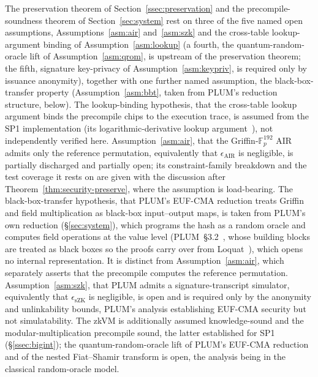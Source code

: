 The preservation theorem of Section~\ref{ssec:preservation} and the precompile-soundness theorem of Section~\ref{sec:system} rest on three of the five named open assumptions, Assumptions~\ref{asm:air} and~\ref{asm:szk} and the cross-table lookup-argument binding of Assumption~\ref{asm:lookup} (a fourth, the quantum-random-oracle lift of Assumption~\ref{asm:qrom}, is upstream of the preservation theorem; the fifth, signature key-privacy of Assumption~\ref{asm:keypriv}, is required only by issuance anonymity), together with one further named assumption, the black-box-transfer property (Assumption~\ref{asm:bbt}, taken from PLUM's reduction structure, below). The lookup-binding hypothesis, that the cross-table lookup argument binds the precompile chips to the execution trace, is assumed from the SP1 implementation (its logarithmic-derivative lookup argument~\cite{haback2022logup}), not independently verified here. Assumption~\ref{asm:air}, that the Griffin-$\mathbb{F}_p^{192}$ AIR admits only the reference permutation, equivalently that $\epsilon_{\mathrm{AIR}}$ is negligible, is partially discharged and partially open; its constraint-family breakdown and the test coverage it rests on are given with the discussion after Theorem~\ref{thm:security-preserve}, where the assumption is load-bearing. The black-box-transfer hypothesis, that PLUM's EUF-CMA reduction treats Griffin and field multiplication as black-box input--output maps, is taken from PLUM's own reduction (\S\ref{sec:system}), which programs the hash as a random oracle and computes field operations at the value level (PLUM~\S3.2~\cite{10.1007/978-981-95-2961-2_6}, whose building blocks are treated as black boxes so the proofs carry over from Loquat~\cite{cryptoeprint:2024/868}), which opens no internal representation. It is distinct from Assumption~\ref{asm:air}, which separately asserts that the precompile computes the reference permutation. Assumption~\ref{asm:szk}, that PLUM admits a signature-transcript simulator, equivalently that $\epsilon_{\mathrm{sZK}}$ is negligible, is open and is required only by the anonymity and unlinkability bounds, PLUM's analysis establishing EUF-CMA security but not simulatability. The zkVM is additionally assumed knowledge-sound and the modular-multiplication precompile sound, the latter established for SP1 (\S\ref{ssec:bigint}); the quantum-random-oracle lift of PLUM's EUF-CMA reduction and of the nested Fiat--Shamir transform is open, the analysis being in the classical random-oracle model.

